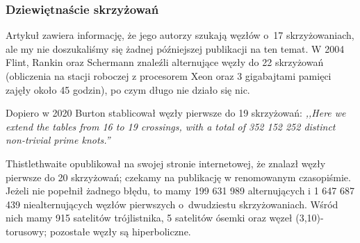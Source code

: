 
\subsubsection{Dziewiętnaście skrzyżowań}
Artykuł \cite{thistlethwaite1998} zawiera informację, że jego autorzy szukają węzłów o~17 skrzyżowaniach, ale my nie doszukaliśmy się żadnej późniejszej publikacji na ten temat.
%
%
%
W 2004 Flint, Rankin oraz Schermann \cite{rankin2004} znaleźli alternujące węzły do 22 skrzyżowań (obliczenia na stacji roboczej z procesorem Xeon oraz 3 gigabajtami pamięci zajęły około 45 godzin), po czym długo nie działo się nic.
%
%
%

Dopiero w 2020 Burton \cite{burton2020} stablicował węzły pierwsze do 19 skrzyżowań: \emph{,,Here we extend the tables from 16 to 19 crossings, with a total of 352 152 252 distinct non-trivial prime knots.''}
%

Thistlethwaite opublikował na swojej stronie internetowej, że znalazł węzły pierwsze do 20 skrzyżowań; czekamy na publikację w renomowanym czasopiśmie.
Jeżeli nie popełnił żadnego błędu, to mamy 199 631 989 alternujących i 1 647 687 439 niealternujących węzłów pierwszych o~dwudziestu skrzyżowaniach.
%
Wśród nich mamy 915 satelitów trójlistnika, 5 satelitów ósemki oraz węzeł (3,10)-torusowy; pozostałe węzły są hiperboliczne.

